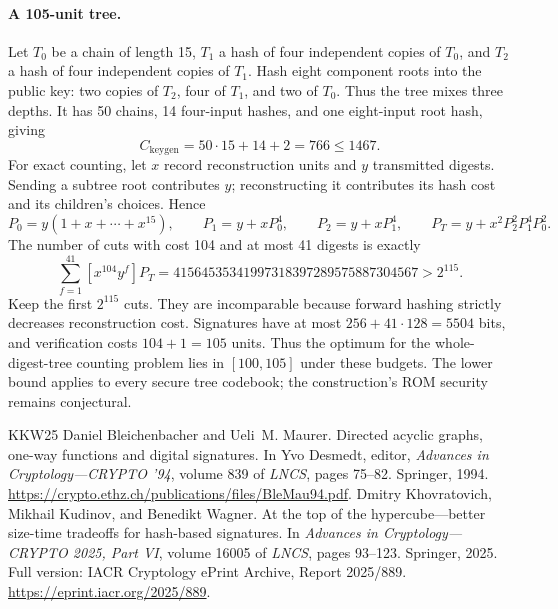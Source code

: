 \documentclass[10pt]{article}
\begin{document}
\paragraph{A 105-unit tree.} Let $T_0$ be a chain of length 15, $T_1$ a hash of four independent copies of $T_0$, and $T_2$ a hash of four independent copies of $T_1$. Hash eight component roots into the public key: two copies of $T_2$, four of $T_1$, and two of $T_0$. Thus the tree mixes three depths. It has 50 chains, 14 four-input hashes, and one eight-input root hash, giving
\[
 C_{\mathrm{keygen}}=50\cdot15+14+2=766\le1467.
\]
For exact counting, let $x$ record reconstruction units and $y$ transmitted digests. Sending a subtree root contributes $y$; reconstructing it contributes its hash cost and its children's choices. Hence
\[
 P_0=y(1+x+\cdots+x^{15}),\qquad P_1=y+xP_0^4,\qquad P_2=y+xP_1^4,\qquad P_T=y+x^2P_2^2P_1^4P_0^2.
\]
The number of cuts with cost 104 and at most 41 digests is exactly
\[
 \sum_{f=1}^{41}[x^{104}y^f]P_T=41564535341997318397289575887304567>2^{115}.
\]
Keep the first $2^{115}$ cuts. They are incomparable because forward hashing strictly decreases reconstruction cost. Signatures have at most $256+41\cdot128=5504$ bits, and verification costs $104+1=105$ units. Thus the optimum for the whole-digest-tree counting problem lies in $[100,105]$ under these budgets. The lower bound applies to every secure tree codebook; the construction's ROM security remains conjectural.

\begin{thebibliography}{KKW25}
 Daniel Bleichenbacher and Ueli~M. Maurer. Directed acyclic graphs, one-way functions and digital signatures. In Yvo Desmedt, editor, \emph{Advances in Cryptology---CRYPTO '94}, volume 839 of \emph{LNCS}, pages 75--82. Springer, 1994. \url{https://crypto.ethz.ch/publications/files/BleMau94.pdf}.
 Dmitry Khovratovich, Mikhail Kudinov, and Benedikt Wagner. At the top of the hypercube---better size-time tradeoffs for hash-based signatures. In \emph{Advances in Cryptology---CRYPTO 2025, Part VI}, volume 16005 of \emph{LNCS}, pages 93--123. Springer, 2025. Full version: IACR Cryptology ePrint Archive, Report 2025/889. \url{https://eprint.iacr.org/2025/889}.
\end{thebibliography}
\end{document}

